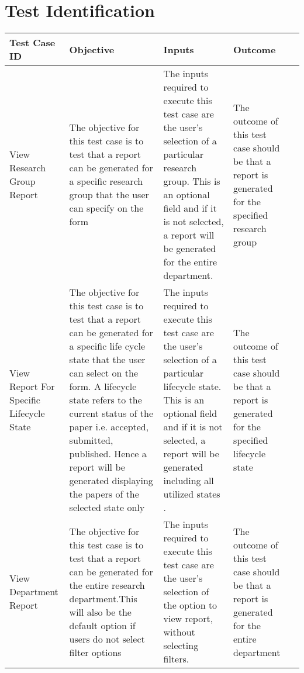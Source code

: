 \section{Test Identification} 
 
\begin{tabular}{ L{3cm}| L{3cm}| L{3cm}| L{3cm}| L{0cm}} 
	\hline      
	\textbf{Test Case ID} & \textbf{Objective} & \textbf{Inputs} & \textbf{Outcome}\\
	\hline 
	\hline
	View Research Group Report  &  
	The objective for this test case is to test that a report can be generated for a specific research group that the user can specify on the form & 
	The inputs required to execute this test case are the user's selection of a particular research group. This is an optional field and if it is not selected, a report will be generated for the entire department. & 
	The outcome of this test case should be that a report is generated for the specified research group & \\
	\hline 
View Report For Specific Lifecycle State  &  
	The objective for this test case is to test that a report can be generated for a specific life cycle state that the user can select on the form. A lifecycle state refers to the current status of the paper i.e. accepted, submitted, published. Hence a report will be generated displaying the papers of the selected state only & 
	The inputs required to execute this test case are the user's selection of a particular lifecycle state. This is an optional field and if it is not selected, a report will be generated including all utilized states . & 
	The outcome of this test case should be that a report is generated for the specified lifecycle state & \\ 
	\hline 
View Department Report &  
	The objective for this test case is to test that a report can be generated for the entire research department.This will also be the default option if users do not select filter options & 
	The inputs required to execute this test case are the user's selection of the option to view report, without selecting filters. & 
	The outcome of this test case should be that a report is generated for the entire department& \\ 
\end{tabular}
\\
